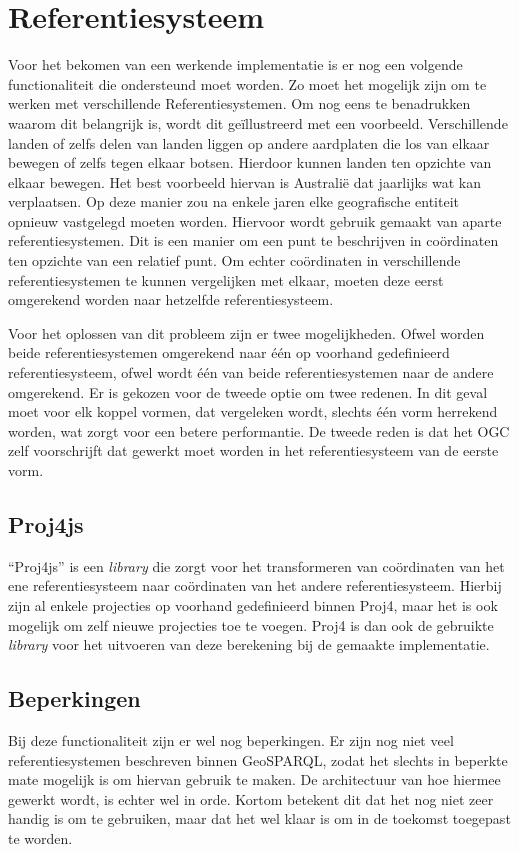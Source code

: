 \section{Referentiesysteem}
\label{sec:projecties}
Voor het bekomen van een werkende implementatie is er nog een volgende functionaliteit die ondersteund moet worden. Zo moet het mogelijk zijn om te werken met verschillende Referentiesystemen. Om nog eens te benadrukken waarom dit belangrijk is, wordt dit geïllustreerd met een voorbeeld. Verschillende landen of zelfs delen van landen liggen op andere aardplaten die los van elkaar bewegen of zelfs tegen elkaar botsen. Hierdoor kunnen landen ten opzichte van elkaar bewegen. Het best voorbeeld hiervan is Australië dat jaarlijks wat kan verplaatsen. Op deze manier zou na enkele jaren elke geografische entiteit opnieuw vastgelegd moeten worden. Hiervoor wordt gebruik gemaakt van aparte referentiesystemen. Dit is een manier om een punt te beschrijven in coördinaten ten opzichte van een relatief punt. Om echter coördinaten in verschillende referentiesystemen te kunnen vergelijken met elkaar, moeten deze eerst omgerekend worden naar hetzelfde referentiesysteem.

Voor het oplossen van dit probleem zijn er twee mogelijkheden. Ofwel worden beide referentiesystemen omgerekend naar één op voorhand gedefinieerd referentiesysteem, ofwel wordt één van beide referentiesystemen naar de andere omgerekend. Er is gekozen voor de tweede optie om twee redenen. In dit geval moet voor elk koppel vormen, dat vergeleken wordt, slechts één vorm herrekend worden, wat zorgt voor een betere performantie. De tweede reden is dat het OGC zelf voorschrijft dat gewerkt moet worden in het referentiesysteem van de eerste vorm.

\subsection{Proj4js}
``Proj4js'' is een \textit{library} die zorgt voor het transformeren van coördinaten van het ene referentiesysteem naar coördinaten van het andere referentiesysteem. Hierbij zijn al enkele projecties op voorhand gedefinieerd binnen Proj4, maar het is ook mogelijk om zelf nieuwe projecties toe te voegen. Proj4 is dan ook de gebruikte \textit{library} voor het uitvoeren van deze berekening bij de gemaakte implementatie.

\subsection{Beperkingen}
Bij deze functionaliteit zijn er wel nog beperkingen. Er zijn nog niet veel referentiesystemen beschreven binnen GeoSPARQL, zodat het slechts in beperkte mate mogelijk is om hiervan gebruik te maken. De architectuur van hoe hiermee gewerkt wordt, is echter wel in orde. Kortom betekent dit dat het nog niet zeer handig is om te gebruiken, maar dat het wel klaar is om in de toekomst toegepast te worden.